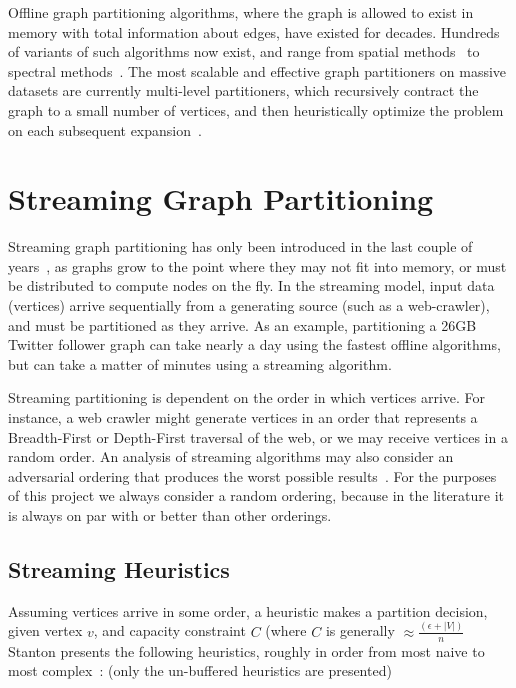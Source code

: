 \documentclass[11pt]{article}
\begin{document}

Offline graph partitioning algorithms, where the graph is allowed to exist in memory with total information about edges, have existed for decades. Hundreds of variants of such algorithms now exist, and range from spatial methods~\cite{Gilbert95geometricmesh} to spectral methods~\cite{arora2009expander}. The most scalable and effective graph partitioners on massive datasets are currently multi-level partitioners, which recursively contract the graph to a small number of vertices, and then heuristically optimize the problem on each subsequent expansion~\cite{karypis1998multilevel}. 

\section{Streaming Graph Partitioning}\vspace{-10 pt}
Streaming graph partitioning has only been introduced in the last couple of years~\cite{DBLP:journals/corr/abs-1212-1121,Stanton:2012:SGP:2339530.2339722,tsourakakis2012fennel}, as graphs grow to the point where they may not fit into memory, or must be distributed to compute nodes on the fly. In the streaming model, input data (vertices) arrive sequentially from a generating source (such as a web-crawler), and must be partitioned as they arrive. As an example, partitioning a 26GB Twitter follower graph can take nearly a day using the fastest offline algorithms, but can take a matter of minutes using a streaming algorithm.

Streaming partitioning is dependent on the order in which vertices arrive. For instance, a web crawler might generate vertices in an order that represents a Breadth-First or Depth-First traversal of the web, or we may receive vertices in a random order. An analysis of streaming algorithms may also consider an adversarial ordering that produces the worst possible results~\cite{Stanton:2012:SGP:2339530.2339722}. For the purposes of this project we always consider a random ordering, because in the literature it is always on par with or better than other orderings. 

\subsection{Streaming Heuristics}
Assuming vertices arrive in some order, a heuristic makes a partition decision, given vertex $v$, and capacity constraint $C$ (where $C$ is generally $\approx \frac{(\epsilon+|V|)}{n}$ Stanton presents the following heuristics, roughly in order from most naive to most complex~\cite{Stanton:2012:SGP:2339530.2339722}: (only the un-buffered heuristics are presented)
\end{document}
